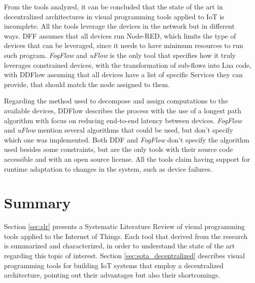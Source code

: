 \par From the tools analyzed, it can be concluded that the state of the art in decentralized architectures in visual programming tools applied to IoT is incomplete. All the tools leverage the devices in the network but in different ways. DFF \cite{ddf} assumes that all devices run Node-RED, which limits the type of devices that can be leveraged, since it needs to have minimum resources to run such program. \textit{FogFlow} and \textit{uFlow} \cite{fog_flow} \cite{flow_based_programming_fog} is the only tool that specifies how it truly leverages constrained devices, with the transformation of sub-flows into Lua code, with DDFlow \cite{ddflow} assuming that all devices have a list of specific Services they can provide, that should match the node assigned to them.
\par Regarding the method used to decompose and assign computations to the available devices, DDFlow describes the process with the use of a longest path algorithm with focus on reducing end-to-end latency between devices. \textit{FogFlow} and \textit{uFlow} \cite{fog_flow} \cite{flow_based_programming_fog} mention several algorithms that could be used, but don't specify which one was implemented. Both DDF \cite{ddf} and \textit{FogFlow} \cite{fog_flow_easy} \cite{fog_flow_tool} don't specify the algorithm used besides some constraints, but are the only tools with their source code accessible and with an open source license. All the tools claim having support for runtime adaptation to changes in the system, such as device failures.


\section{Summary}

Section \ref{sec:slr} presents a Systematic Literature Review of visual programming tools applied to the Internet of Things. Each tool that derived from the research is summarized and characterized, in order to understand the state of the art regarding this topic of interest. Section \ref{sec:sota_decentralized} describes visual programming tools for building IoT systems that employ a decentralized architecture, pointing out their advantages but also their shortcomings.

